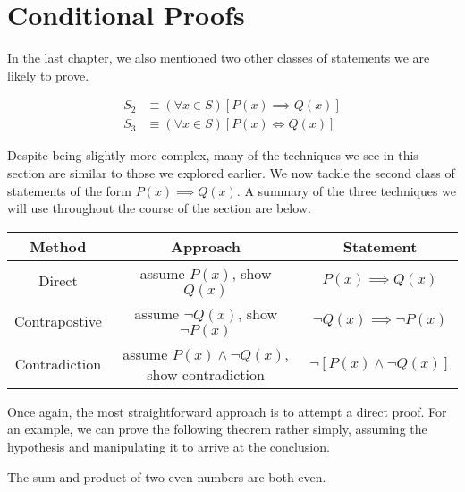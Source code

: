 \section{Conditional Proofs}

In the last chapter, we also mentioned two other classes of statements we are likely to prove.

\begin{align*}
	S_2 &\equiv (\forall x \in S)[P(x) \implies Q(x)] \\
	S_3 &\equiv (\forall x \in S)[P(x) \iff Q(x)]
\end{align*}

Despite being slightly more complex, many of the techniques we see in this section are similar to those we explored earlier. We now tackle the second class of statements of the form $P(x) \implies Q(x)$. A summary of the three techniques we will use throughout the course of the section are below.

\begin{center}
	\begin{tabular}{ccc}
		\toprule
		Method & Approach & Statement \\
		\midrule
		Direct & assume $P(x)$, show $Q(x)$ & $P(x) \implies Q(x)$ \\
		Contrapostive & assume $\neg Q(x)$, show $\neg P(x)$ & $\neg Q(x) \implies \neg P(x)$ \\
		Contradiction & assume $P(x) \wedge \neg Q(x)$, show contradiction & $\neg[P(x) \wedge \neg Q(x)]$ \\
		\bottomrule
	\end{tabular}
\end{center}
\vspace{\baselineskip}

Once again, the most straightforward approach is to attempt a direct proof. For an example, we can prove the following theorem rather simply, assuming the hypothesis and manipulating it to arrive at the conclusion.

\vspace{\baselineskip}
\begin{theorem}
	The sum and product of two even numbers are both even. 
\end{theorem}

